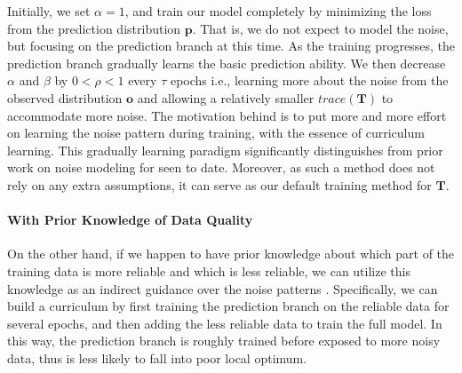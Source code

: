 Initially, we set $\alpha=1$, and train our model  completely by minimizing the loss from the prediction distribution $\mathbf{p}$. That is, we do not expect to model the noise,  but focusing  on the prediction branch at this time. As the training progresses, the prediction branch gradually learns the basic prediction ability. We then decrease $\alpha$ and  $\beta$ by $0<\rho<1$  every $\tau$ epochs i.e., learning more about the noise from the observed distribution $\mathbf{o}$ and allowing a relatively smaller $trace(\mathbf{T})$ to accommodate more noise.
The motivation behind is to put more and more effort on learning the noise pattern during training, 
with the essence of curriculum learning.
This gradually learning paradigm significantly distinguishes from prior work on noise modeling for \DS seen to date. 
Moreover, as such a method does not rely on any extra assumptions,
it can serve as our default training method for $\mathbf{T}$.

\paragraph{With Prior Knowledge of Data Quality}
On the other hand, if we happen to have prior knowledge about which part of the training data is more reliable and which is less reliable, we can utilize this knowledge as an indirect guidance over the noise patterns . Specifically, we can build a curriculum by first training the prediction branch on the reliable data for several epochs, and then adding the less reliable data to train the full model. In this way, the prediction branch is roughly trained before exposed to more noisy data, thus is less likely to fall into poor local optimum.

